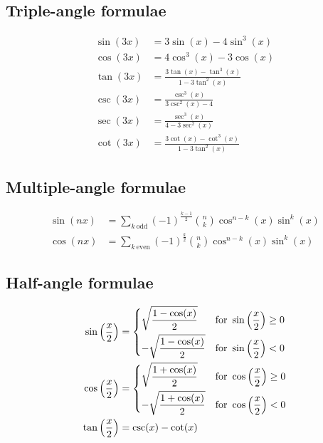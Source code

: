 \documentclass{article}
\begin{document}
\subsection{Triple-angle formulae}
\begin{align}
\sin(3x)&=3\sin(x)-4\sin^3(x)\\
\cos(3x)&=4\cos^3(x)-3\cos(x)\\
\tan(3x)&=\frac{3\tan(x)-\tan^3(x)}{1-3\tan^2(x)}\\
\csc(3x)&=\frac{\csc^3(x)}{3\csc^2(x)-4}\\
\sec(3x)&=\frac{\sec^3(x)}{4-3\sec^2(x)}\\
\cot(3x)&=\frac{3\cot(x)-\cot^3(x)}{1-3\tan^2(x)}
\end{align}

\subsection{Multiple-angle formulae}
\begin{align}
\sin(nx)&=\sum_{k\ \mathrm{odd}}{(-1)^{\frac{k-1}{2}}\binom{n}{k}\cos^{n-k}(x)\sin^k(x)}\\
\cos(nx)&=\sum_{k\ \mathrm{even}}{(-1)^{\frac{k}{2}}\binom{n}{k}\cos^{n-k}(x)\sin^k(x)}
\end{align}

\subsection{Half-angle formulae}
\begin{align}
\sin\left(\frac{x}{2}\right)&=
\begin{dcases}
\sqrt{\dfrac{1-\cos(x)}{2}}&\mathrm{for\ }\sin\left(\frac{x}{2}\right)\geq0\\
-\sqrt{\dfrac{1-\cos(x)}{2}}&\mathrm{for\ }\sin\left(\frac{x}{2}\right)<0\\
\end{dcases}
\\
\cos\left(\frac{x}{2}\right)&=
\begin{dcases}
\sqrt{\dfrac{1+\cos(x)}{2}}&\mathrm{for\ }\cos\left(\frac{x}{2}\right)\geq0\\
-\sqrt{\dfrac{1+\cos(x)}{2}}&\mathrm{for\ }\cos\left(\frac{x}{2}\right)<0\\
\end{dcases}
\\
\tan\left(\frac{x}{2}\right)&=\csc(x)-\cot(x)\\
\end{align}
\end{document}
